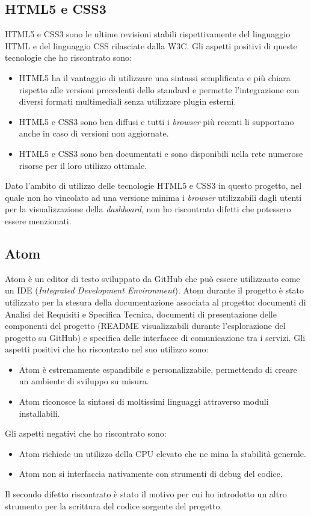\subsection{HTML5 e CSS3}

HTML5 e CSS3 sono le ultime revisioni stabili rispettivamente del linguaggio HTML e del linguaggio CSS rilasciate dalla W3C.
Gli aspetti positivi di queste tecnologie che ho riscontrato sono:
\begin{itemize}
	\item HTML5 ha il vantaggio di utilizzare una sintassi semplificata e più chiara rispetto alle versioni precedenti dello standard e permette l’integrazione con diversi formati multimediali senza utilizzare plugin esterni.
	\item HTML5 e CSS3 sono ben diffusi e tutti i \emph{browser} più recenti li supportano anche in caso di versioni non aggiornate.
	\item HTML5 e CSS3 sono ben documentati e sono disponibili nella rete numerose risorse per il loro utilizzo ottimale.
\end{itemize}
Dato l'ambito di utilizzo delle tecnologie HTML5 e CSS3 in questo progetto, nel quale non ho vincolato ad una versione minima i \emph{browser} utilizzabili dagli utenti per la visualizzazione della \emph{dashboard}, non ho riscontrato difetti che potessero essere menzionati.

\subsection{Atom}
\label{subsec:atom}

Atom è un editor di testo sviluppato da GitHub che può essere utilizzaato come un IDE (\emph{Integrated Development Environment}).
Atom durante il progetto è stato utilizzato per la stesura della documentazione associata al progetto: documenti di Analisi dei Requisiti e Specifica Tecnica, documenti di presentazione delle componenti del progetto (README visualizzabili durante l'esplorazione del progetto su GitHub) e specifica delle interfacce di comunicazione tra i servizi.
Gli aspetti positivi che ho riscontrato nel suo utilizzo sono:
\begin{itemize}
	\item Atom è estremamente espandibile e personalizzabile, permettendo di creare un ambiente di sviluppo su misura.
	\item Atom riconosce la sintassi di moltissimi linguaggi attraverso moduli installabili.
\end{itemize}
Gli aspetti negativi che ho riscontrato sono:
\begin{itemize}
	\item Atom richiede un utilizzo della CPU elevato che ne mina la stabilità generale.
	\item Atom non si interfaccia nativamente con strumenti di debug del codice.
\end{itemize}
Il secondo difetto riscontrato è stato il motivo per cui ho introdotto un altro strumento per la scrittura del codice sorgente del progetto.

